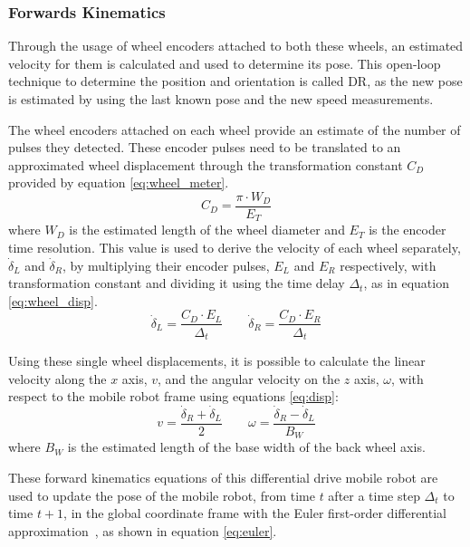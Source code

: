 \subsubsection{Forwards Kinematics}
\label{sec:forwards}

Through the usage of wheel encoders attached to both these wheels, an estimated velocity for them is calculated and used to determine its pose.
This open-loop technique to determine the position and orientation is called \gls{DR}, as the new pose is estimated by using the last known pose and the new speed measurements.

The wheel encoders attached on each wheel provide an estimate of the number of pulses they detected. These encoder pulses need to be translated to an approximated wheel displacement through the transformation constant $C_{D}$ provided by equation \ref{eq:wheel_meter}.
\begin{equation}
C_{D} = \frac{\pi \cdot W_D }{E_T}
\label{eq:wheel_meter}
\end{equation} where $W_D$ is the estimated length of the wheel diameter and $E_T$ is the encoder time resolution.
This value is used to derive the velocity of each wheel separately, $\dot \delta_L$ and $\dot \delta_R$, by multiplying their encoder pulses, $E_L$ and  $E_R$ respectively, with transformation constant and dividing it using the time delay $\Delta_t$, as in equation \ref{eq:wheel_disp}.
\begin{equation}
\dot \delta_{L} = \frac{C_D \cdot E_L}{\Delta_t}  \qquad
\dot \delta_{R} = \frac{C_D \cdot E_R}{\Delta_t}
\label{eq:wheel_disp}
\end{equation}

Using these single wheel displacements, it is possible to calculate the linear velocity along the $x$ axis, $v$, and the angular velocity on the $z$ axis, $\omega$, with respect to the mobile robot frame using equations \ref{eq:disp}:
\begin{equation}
    v =\frac{\dot \delta_{R} + \dot \delta_{L} }{2} \qquad \omega = \frac{\dot \delta _{R} - \dot \delta_{L}}{B_W}
\label{eq:disp}
\end{equation} where $B_W$ is the estimated length of the base width of the back wheel axis.


These forward kinematics equations of this differential drive mobile robot are used to update the pose of the mobile robot, from time $t$ after a time step $\Delta_t$ to time $t+1$, in the global coordinate frame with the Euler first-order differential approximation~\cite{braun_first-order_1993}, as shown in equation \ref{eq:euler}.

